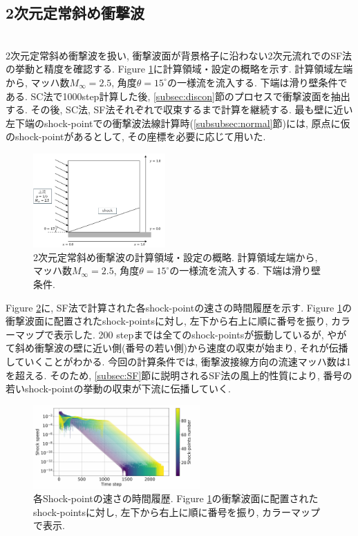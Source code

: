 \documentclass[a4j]{jarticle}
\begin{document}
\subsection{2次元定常斜め衝撃波}\label{subsec:2Ddiag}
\mbox{}\\[-3.0ex]

2次元定常斜め衝撃波を扱い, 衝撃波面が背景格子に沿わない2次元流れでのSF法の挙動と精度を確認する.
Figure \ref{fig:2Ddiagsituation}に計算領域・設定の概略を示す.
計算領域左端から, マッハ数$M_\infty=2.5$, 角度$\theta=15^\circ$の一様流を流入する.
下端は滑り壁条件である. SC法で1000step計算した後, \ref{subsec:discon}節のプロセスで衝撃波面を抽出する.
その後, SC法, SF法それぞれで収束するまで計算を継続する. 最も壁に近い左下端のshock-pointでの衝撃波法線計算時(\ref{subsubsec:normal}節)には,
原点に仮のshock-pointがあるとして, その座標を必要に応じて用いた.
\begin{figure}[H]
    \begin{center}
        \includegraphics[width=0.45\textwidth]{2Ddiagsituation.pdf}
    \end{center}
    \caption{2次元定常斜め衝撃波の計算領域・設定の概略.
    計算領域左端から, マッハ数$M_\infty=2.5$, 角度$\theta=15^\circ$の一様流を流入する.
    下端は滑り壁条件.}
    \label{fig:2Ddiagsituation}
\end{figure}
Figure \ref{fig:2Ddiagconv}に, SF法で計算された各shock-pointの速さの時間履歴を示す.
Figure \ref{fig:2Ddiagsituation}の衝撃波面に配置されたshock-pointsに対し, 
左下から右上に順に番号を振り, カラーマップで表示した.
200 stepまでは全てのshock-pointsが振動しているが, やがて斜め衝撃波の壁に近い側(番号の若い側)から速度の収束が始まり,
それが伝播していくことがわかる.
今回の計算条件では, 衝撃波接線方向の流速マッハ数は1を超える.
そのため, \ref{subsec:SF}節に説明されるSF法の風上的性質により, 
番号の若いshock-pointの挙動の収束が下流に伝播していく.
\begin{figure}[h]
    \centering
    \hspace*{-8mm} %
    \includegraphics[width=0.57\textwidth]{2Ddiagconv.pdf}
    \caption{各Shock-pointの速さの時間履歴. Figure \ref{fig:2Ddiagsituation}の衝撃波面に配置されたshock-pointsに対し, 
左下から右上に順に番号を振り, カラーマップで表示.}
    \label{fig:2Ddiagconv}
\end{figure}
\end{document}
